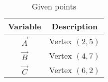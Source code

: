 \begin{table}[h!]
\centering
\begin{tabular}{|c|c|}
\hline
\textbf{Variable} & \textbf{Description} \\
\hline
$\vec{A}$ & Vertex $(2,5)$ \\
$\vec{B}$ & Vertex $(4,7)$ \\
$\vec{C}$ & Vertex $(6,2)$ \\
\hline
\end{tabular}
\caption{Given points}
\label{tab:2.7.31}
\end{table}